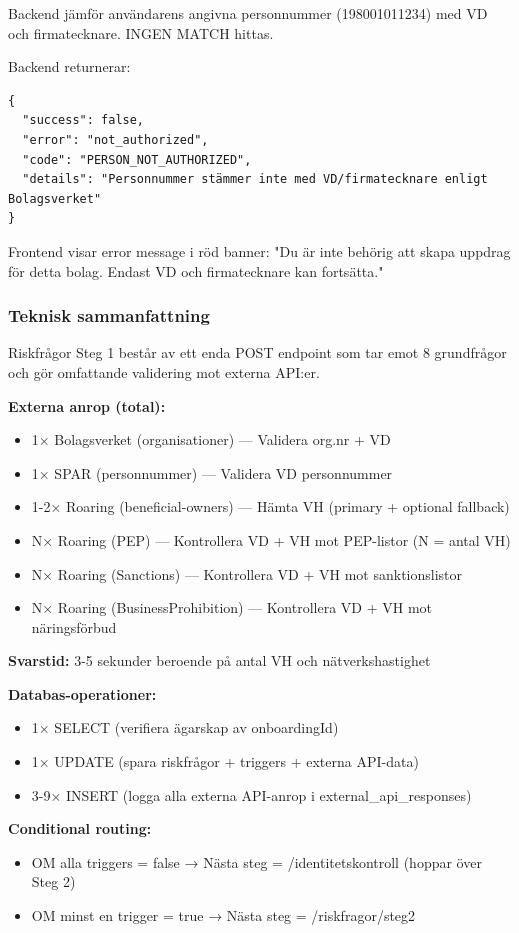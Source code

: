 Backend jämför användarens angivna personnummer (198001011234) med VD och firmatecknare. INGEN MATCH hittas.

Backend returnerar:
\begin{lstlisting}
{
  "success": false,
  "error": "not_authorized",
  "code": "PERSON_NOT_AUTHORIZED",
  "details": "Personnummer stämmer inte med VD/firmatecknare enligt Bolagsverket"
}
\end{lstlisting}

Frontend visar error message i röd banner: "Du är inte behörig att skapa uppdrag för detta bolag. Endast VD och firmatecknare kan fortsätta."

\subsubsection{Teknisk sammanfattning}

Riskfrågor Steg 1 består av ett enda POST endpoint som tar emot 8 grundfrågor och gör omfattande validering mot externa API:er.

\textbf{Externa anrop (total):}
\begin{itemize}[noitemsep]
  \item 1× Bolagsverket (organisationer) — Validera org.nr + VD
  \item 1× SPAR (personnummer) — Validera VD personnummer
  \item 1-2× Roaring (beneficial-owners) — Hämta VH (primary + optional fallback)
  \item N× Roaring (PEP) — Kontrollera VD + VH mot PEP-listor (N = antal VH)
  \item N× Roaring (Sanctions) — Kontrollera VD + VH mot sanktionslistor
  \item N× Roaring (BusinessProhibition) — Kontrollera VD + VH mot näringsförbud
\end{itemize}

\textbf{Svarstid:} 3-5 sekunder beroende på antal VH och nätverkshastighet

\textbf{Databas-operationer:}
\begin{itemize}[noitemsep]
  \item 1× SELECT (verifiera ägarskap av onboardingId)
  \item 1× UPDATE (spara riskfrågor + triggers + externa API-data)
  \item 3-9× INSERT (logga alla externa API-anrop i external\_api\_responses)
\end{itemize}

\textbf{Conditional routing:}
\begin{itemize}[noitemsep]
  \item OM alla triggers = false → Nästa steg = /identitetskontroll (hoppar över Steg 2)
  \item OM minst en trigger = true → Nästa steg = /riskfragor/steg2
\end{itemize}

